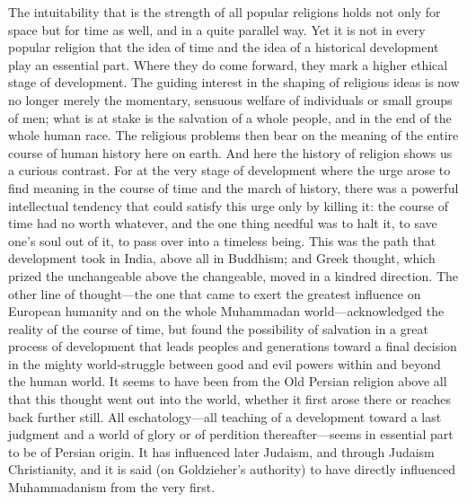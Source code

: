 \documentclass[12pt,a4paper]{article}
\newcommand{\opage}[1]{\marginnote{\footnotesize\textit{[#1]}}}
\begin{document}
The intuitability that is the strength of all popular religions holds not only for
space but for time as well, and in a quite parallel way. Yet it is not in every
popular religion that the idea of time and the idea of a historical development
play an essential part. Where they do come forward, they mark a higher ethical
stage of development. The guiding interest in the shaping of religious ideas is now
no longer merely the momentary, sensuous welfare of individuals or small groups of
men; what is at stake is the salvation of a whole people, and in the end of the
whole human race. The religious problems then bear on the meaning of the entire
course of human history here on earth. And here the history of religion shows us a
curious contrast. For at the very stage of development where the urge arose to find
meaning in the course of time and the march of history, there was a powerful
intellectual tendency that could satisfy this urge only by killing it: the course
of time had no worth whatever, and the one thing needful was to halt it, to save
one's soul out of it, to pass over into a timeless being. This was the path that
development took in India, above all in Buddhism; and Greek thought, which prized
the unchangeable above the changeable, moved in a kindred direction. The other line
of thought---the one that came to exert the greatest influence on European humanity
and on the whole Muhammadan world---acknowledged the reality of the course of time,
but found the possibility of salvation in a great process of development that leads
peoples and generations toward a final decision in the mighty world-struggle
between good and evil powers within and beyond the human world. \opage{14}It seems to have
been from the Old Persian religion above all that this thought went out into the
world, whether it first arose there or reaches back further still. All
eschatology---all teaching of a development toward a last judgment and a world of
glory or of perdition thereafter---seems in essential part to be of Persian origin.
It has influenced later Judaism, and through Judaism Christianity, and it is said
(on Goldzieher's authority) to have directly influenced Muhammadanism from the very
first.
\end{document}
